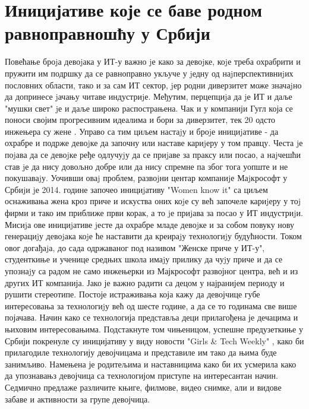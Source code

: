 \documentclass[a4paper]{article}
\begin{document}


\section{Иницијативе које се баве родном равноправношћу у Србији}
\label{sec:naslov3}

Повећање броjа девоjака у ИТ-у важно jе како за девоjке, коjе
треба охрабрити и пружити им подршку да се равноправно укључе у
jедну од наjперспективниjих пословних области, тако и за сам ИТ сектор, 
jер родни диверзитет може значаjно да допринесе jачању читаве индустриjе. 
Међутим, перцепциjа да jе ИТ и даље "мушки свет" jе и
даље широко распострањена. Чак и у компанији Гугл која се поноси својим 
прогресивним идеалима и бори за диверзитет, тек 20 одсто инжењера су жене\cite{gugl} . 
Управо са тим циљем настаjу и броjе инициjативе - да охрабре и подрже девоjке 
да започну или наставе кариjеру у том правцу.
Честа jе поjава да се девоjке ређе одлучуjу да се приjаве за праксу
или посао, а наjчешћи став jе да нису довољно добре или да нису
спремне па због тога уопште и не покушаваjу. Уочивши оваj проблем,
развоjни центар компаниjе Маjкрософт у Србиjи jе 2014. године започео 
инициjативу "Women know it" \cite{microsoft} са циљем оснаживања жена кроз
приче и искуства оних коjе су већ започеле кариjеру у тоj фирми и
тако им приближе први корак, а то jе приjава за посао у ИТ индустриjи. 
Мисиjа ове инициjативе jесте да охрабре младе девоjке и за
собом повуку нову генерациjу девоjака коjе ће наставити да креираjу
технологиjу будућности. Током овог догађаjа, до сада одржаваног
под називом "Женске приче у ИТ-у", студенткиње и ученице средњих школа имаjу 
прилику да чуjу приче и да се упознаjу са радом не само инжењерки из Мајкрософт 
развојног центра, већ и из других ИТ компанија.
Јако је важно радити са децом у најранијем периоду и рушити стереотипе. Постоје 
истраживања која кажу да девојчице губе интересовања за технологиjу већ од шесте 
године, а да се то годинама све више појачава. Начин како се технологија 
представља деци прилагођена је дечацима и њиховим интересовањима. Подстакнуте 
том чињеницом, успешне предузеткиње у Србији покренуле су иницијативу у виду 
новости "Girls \& Tech Weekly" \cite{girls}, како би прилагодиле технологију девојчицама и 
представиле им тако да њима буде занимљиво. Намењена је родитељима и наставницима 
како би их усмерила како да упознавањз девојчица са технологијом приступе на 
интересантан начин. Седмично предлаже различите књиге, филмове, видео снимке, али 
и видове забаве и активности за групе девојчица.
\end{document}
